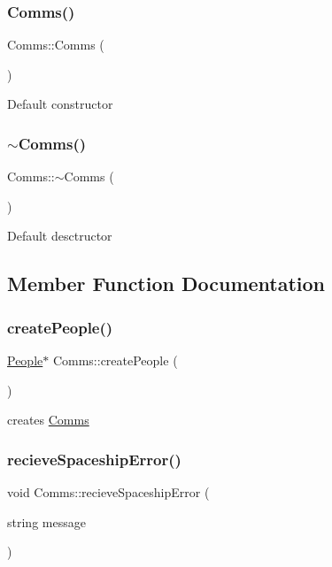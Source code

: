 \subsubsection{\texorpdfstring{Comms()}{Comms()}}
{\footnotesize\ttfamily Comms\+::\+Comms (\begin{DoxyParamCaption}{ }\end{DoxyParamCaption})\hspace{0.3cm}{\ttfamily [inline]}}

Default constructor \mbox{\label{classComms_ad18d3a80a82d18d27b0de3b551e4f5fc}} 
\subsubsection{\texorpdfstring{$\sim$\+Comms()}{~Comms()}}
{\footnotesize\ttfamily Comms\+::$\sim$\+Comms (\begin{DoxyParamCaption}{ }\end{DoxyParamCaption})\hspace{0.3cm}{\ttfamily [inline]}}

Default desctructor 

\subsection{Member Function Documentation}
\mbox{\label{classComms_a137be676b73cbc1071145bf0afc37b0b}} 
\subsubsection{\texorpdfstring{create\+People()}{createPeople()}}
{\footnotesize\ttfamily \hyperlink{classPeople}{People}$\ast$ Comms\+::create\+People (\begin{DoxyParamCaption}{ }\end{DoxyParamCaption})}

creates \hyperlink{classComms}{Comms} \mbox{\label{classComms_a1aed1c01a813afd55309fdc59d2871bf}} 
\subsubsection{\texorpdfstring{recieve\+Spaceship\+Error()}{recieveSpaceshipError()}}
{\footnotesize\ttfamily void Comms\+::recieve\+Spaceship\+Error (\begin{DoxyParamCaption}\item[{string}]{message }\end{DoxyParamCaption})\hspace{0.3cm}{\ttfamily [virtual]}}


